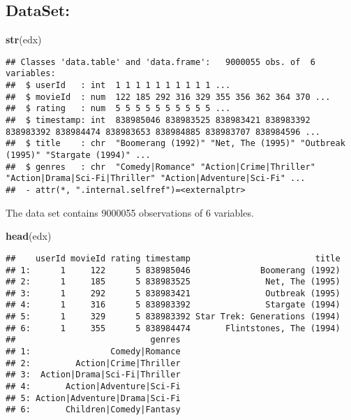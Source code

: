 \documentclass[
]{article}
\newenvironment{Shaded}{\begin{snugshade}}{\end{snugshade}}
\newcommand{\KeywordTok}[1]{\textcolor[rgb]{0.13,0.29,0.53}{\textbf{#1}}}
\newcommand{\NormalTok}[1]{#1}
\begin{document}
\newpage

\hypertarget{dataset}{%
\subsection{\texorpdfstring{\textbf{DataSet:}}{DataSet:}}\label{dataset}}

\begin{Shaded}
\begin{Highlighting}[]
\KeywordTok{str}\NormalTok{(edx)}
\end{Highlighting}
\end{Shaded}

\begin{verbatim}
## Classes 'data.table' and 'data.frame':   9000055 obs. of  6 variables:
##  $ userId   : int  1 1 1 1 1 1 1 1 1 1 ...
##  $ movieId  : num  122 185 292 316 329 355 356 362 364 370 ...
##  $ rating   : num  5 5 5 5 5 5 5 5 5 5 ...
##  $ timestamp: int  838985046 838983525 838983421 838983392 838983392 838984474 838983653 838984885 838983707 838984596 ...
##  $ title    : chr  "Boomerang (1992)" "Net, The (1995)" "Outbreak (1995)" "Stargate (1994)" ...
##  $ genres   : chr  "Comedy|Romance" "Action|Crime|Thriller" "Action|Drama|Sci-Fi|Thriller" "Action|Adventure|Sci-Fi" ...
##  - attr(*, ".internal.selfref")=<externalptr>
\end{verbatim}

The data set contains 9000055 observations of 6 variables.

\begin{Shaded}
\begin{Highlighting}[]
\KeywordTok{head}\NormalTok{(edx)}
\end{Highlighting}
\end{Shaded}

\begin{verbatim}
##    userId movieId rating timestamp                         title
## 1:      1     122      5 838985046              Boomerang (1992)
## 2:      1     185      5 838983525               Net, The (1995)
## 3:      1     292      5 838983421               Outbreak (1995)
## 4:      1     316      5 838983392               Stargate (1994)
## 5:      1     329      5 838983392 Star Trek: Generations (1994)
## 6:      1     355      5 838984474       Flintstones, The (1994)
##                           genres
## 1:                Comedy|Romance
## 2:         Action|Crime|Thriller
## 3:  Action|Drama|Sci-Fi|Thriller
## 4:       Action|Adventure|Sci-Fi
## 5: Action|Adventure|Drama|Sci-Fi
## 6:       Children|Comedy|Fantasy
\end{verbatim}
\end{document}
